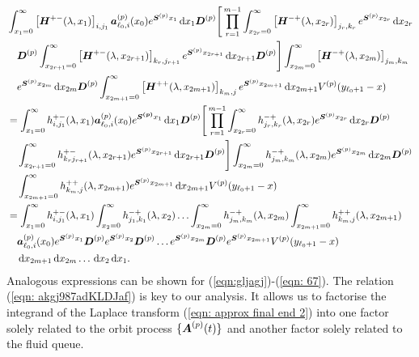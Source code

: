\begin{align}
	&\int_{x_1=0}^\infty \left[\bs H^{+-}(\lambda,x_1)\right]_{i,j_{1}}\bs   a_{\ell_0,i}^{(p)}(x_0)e^{\bs{S}^{(p)}x_1}\wrt x_1 \bs{D}^{(p)}\nonumber%
	\Bigg[\prod_{r=1}^{m-1} \int_{x_{2r}=0}^\infty \left[\bs H^{-+}(\lambda,x_{2r})\right]_{j_{r},k_r} e^{\bs{S}^{(p)}x_{2r}}\wrt x_{2r}\\&\quad\nonumber 
	  \bs{D}^{(p)}\int_{x_{2r+1}=0}^\infty \left[\bs H^{+-}(\lambda,x_{2r+1})\right]_{k_r,j_{r+1}} 
	e^{\bs{S}^{(p)}x_{2r+1}} \wrt x_{2r+1} \bs{D}^{(p)}\Bigg] \int_{x_{2m}=0}^\infty \left[\bs H^{-+}(\lambda,x_{2m})\right]_{j_{m},k_m} 
	 \\&\quad \nonumber e^{\bs{S}^{(p)}x_{2m}} \wrt x_{2m} \bs{D}^{(p)}
	\int_{x_{2m+1}=0}^\infty \left[\bs H^{++}(\lambda,x_{2m+1})\right]_{k_m,j} \nonumber
	e^{\bs{S}^{(p)}x_{2m+1}} \wrt x_{2m+1}V^{(p)}(y_{\ell_0+1}-x)  \nonumber
	\\
	&=\int_{x_1=0}^\infty h^{+-}_{i,j_{1}}(\lambda,x_1)\bs   a_{\ell_0,i}^{(p)}(x_0)e^{\bs{S^{(p)}}x_1}\wrt x_1 \bs{D}^{(p)}\nonumber
	\Bigg[\prod_{r=1}^{m-1} \int_{x_{2r}=0}^\infty h^{-+}_{j_r,k_r}(\lambda,x_{2r}) e^{\bs{S}^{(p)}x_{2r}}\wrt x_{2r}\bs D^{(p)}
	\\&\nonumber \quad \int_{x_{2r+1}=0}^\infty h^{+-}_{k_rj_{r+1}}(\lambda,x_{2r+1}) e^{\bs{S}^{(p)}x_{2r+1}} \wrt x_{2r+1}\bs D^{(p)}\Bigg]
	\int_{x_{2m}=0}^\infty h^{-+}_{j_{m},k_m}(\lambda, x_{2m}) e^{\bs{S}^{(p)}x_{2m}} \wrt x_{2m} \bs{D}^{(p)}
	\\&\nonumber \quad \int_{x_{2m+1}=0}^\infty h^{++}_{k_m,j}(\lambda,x_{2m+1}) e^{\bs{S}^{(p)}x_{2m+1}}\wrt x_{2m+1}V^{(p)}(y_{\ell_0+1}-x) \nonumber
	\\&=\int_{x_1=0}^\infty h^{+-}_{i,j_{1}}(\lambda,x_1)
	\int_{x_2=0}^\infty h^{-+}_{j_1,k_1}(\lambda,x_2)
	\hdots \int_{x_{2m}=0}^\infty h^{-+}_{j_{m},k_m}(\lambda, x_{2m})  \int_{x_{2m+1}=0}^\infty h^{++}_{k_m,j}(\lambda,x_{2m+1})\nonumber
	\\&
	 \quad \bs   a_{\ell_0,i}^{(p)}(x_0)e^{\bs{S}^{(p)}x_1} \bs{D}^{(p)} e^{\bs{S}^{(p)}x_2} \bs{D}^{(p)}\dots e^{\bs{S}^{(p)}x_{2m}}  \bs{D}^{(p)}e^{\bs{S}^{(p)}x_{2m+1}} V^{(p)}(y_{\ell_0+1}-x)  \nonumber 
	 \\&\quad{}\wrt x_{2m+1} \wrt x_{2m}\dots\wrt x_2 \wrt x_1. \label{eqn: approx final end 2}
\end{align}
Analogous expressions can be shown for (\ref{eqn:gljagj})-(\ref{eqn: 67}). The relation (\ref{eqn: akgj987adKLDJaf}) is key to our analysis. It allows us to factorise the integrand of the Laplace transform (\ref{eqn: approx final end 2}) into one factor solely related to the orbit process \(\{\boldsymbol A^{(p)}(t)\}\) and another factor solely related to the fluid queue. 

